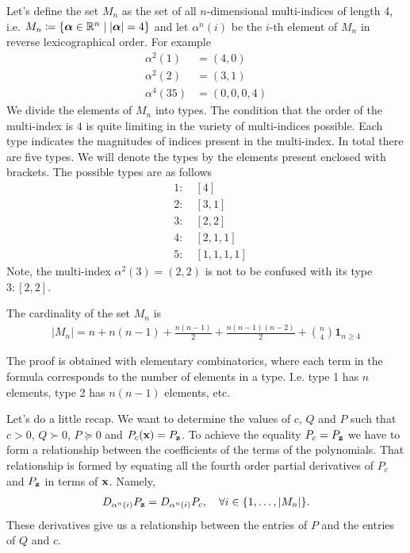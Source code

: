 \documentclass[a4paper,12pt,twoside,BCOR=10mm]{scrbook}
\begin{document}
Let's define the set $M_n$ as the set of all $n$-dimensional multi-indices of length 4, i.e. $M_n \coloneqq \{\bm{\alpha} \in \mathbb{R}^{n} \mid |\bm{\alpha}| = 4\}$ and let $\alpha^n(i)$ be the $i$-th element of $M_n$ in reverse lexicographical order. For example
\begin{align*}
    \alpha^2(1) &= (4, 0)\\
    \alpha^2(2) &= (3, 1)\\
    \alpha^4(35) &= (0, 0, 0, 4)
\end{align*}
We divide the elements of $M_n$ into types. The condition that the order of the multi-index is $4$ is quite limiting in the variety of multi-indices possible. Each type indicates the magnitudes of indices present in the multi-index. In total there are five types. We will denote the types by the elements present enclosed with brackets. The possible types are as follows
\begin{align*}
    &1:\quad [4]\\
    &2:\quad [3,1]\\
    &3:\quad [2,2]\\
    &4:\quad [2,1,1]\\
    &5:\quad [1,1,1,1]
\end{align*}
Note, the multi-index $\alpha^2(3) = (2,2)$ is not to be confused with its type $3: [2,2]$.

\begin{theorem}\label{ThmCardinalityOfMn}
The cardinality of the set $M_n$ is
\begin{align*}
    |M_n| = n + n(n - 1) + \frac{n(n - 1)}{2} + \frac{n(n - 1)(n - 2)}{2} + \binom{n}{4}\mathbf{1}_{n\geq 4}
\end{align*}
\end{theorem}
The proof is obtained with elementary combinatorics, where each term in the formula corresponds to the number of elements in a type. I.e. type 1 has $n$ elements, type 2 has $n(n - 1)$ elements, etc.

Let's do a little recap. We want to determine the values of $c$, $Q$ and $P$ such that $c > 0$, $Q \succ 0$, $P \succeq 0$ and $P_c(\mathbf{x}) = P_{\mathbf{z}}$. To achieve the equality $P_c = P_{\mathbf{z}}$ we have to form a relationship between the coefficients of the terms of the polynomials. That relationship is formed by equating all the fourth order partial derivatives of $P_c$ and $P_{\mathbf{z}}$ in terms of $\mathbf{x}$. Namely,
\begin{align}\label{RelationsGeneralCase}
    D_{\alpha^n(i)} P_{\mathbf{z}} = D_{\alpha^n(i)} P_c, \quad \forall i\in\{1,\ldots,  |M_n|\}.
\end{align}
These derivatives give us a relationship between the entries of $P$ and the entries of $Q$ and $c$.
\end{document}
